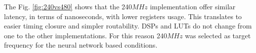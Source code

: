\documentclass[../../main.tex]{subfiles}
\begin{document}
The Fig. \ref{fig:240vs480} shows that the 240$MHz$ implementation offer similar latency, in terms of nanoseconds, with lower registers usage. This translates to easier timing closure and simpler routability. DSPs and LUTs do not change from one to the other implementations. For this reason 240$MHz$ was selected as target frequency for the neural network based conditions.
\end{document}
